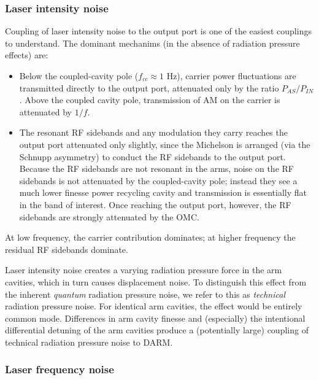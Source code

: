 \subsubsection{Laser intensity noise}

Coupling of laser intensity noise to the output port is one of the easiest
couplings to understand.  The dominant mechanims (in the absence of radiation
pressure effects) are:
%
\begin{itemize}
\item Below the coupled-cavity pole ($f_{cc}\approx 1$ Hz), carrier power
  fluctuations are transmitted directly to the output port, attenuated only by
  the ratio $P_{AS}/P_{IN}$.  Above the coupled cavity pole, transmission of AM
  on the carrier is attenuated by $1/f$.
\item The resonant RF sidebands and any modulation they carry reaches the output
  port attenuated only slightly, since the Michelson is arranged (via the
  Schnupp asymmetry) to conduct the RF sidebands to the output port.  Because
  the RF sidebands are not resonant in the arms, noise on the RF sidebands is
  not attenuated by the coupled-cavity pole; instead they see a much lower
  finesse power recycling cavity and transmission is essentially flat in the
  band of interest.  Once reaching the output port, however, the RF sidebands
  are strongly attenuated by the OMC.
\end{itemize}
At low frequency, the carrier contribution dominates; at higher frequency the
residual RF sidebands dominate.

Laser intensity noise creates a varying radiation pressure force in the arm
cavities, which in turn causes displacement noise.  To distinguish this effect
from the inherent \emph{quantum} radiation pressure
noise\cite{Caves1980QuantumMechanical}, we refer to this as \emph{technical}
radiation pressure noise.  For identical arm cavities, the effect would be
entirely common mode.  Differences in arm cavity finesse and (especially) the
intentional differential detuning of the arm cavities produce a (potentially
large\cite{ChaibiOptomechanical}) coupling of technical radiation pressure noise
to DARM.

\subsubsection{Laser frequency noise}

